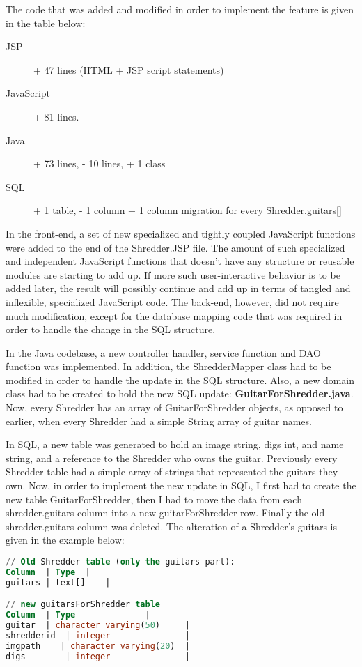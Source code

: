 The code that was added and modified in order to implement the feature is given in the table below:
\begin{description}
  \item[JSP] + 47 lines (HTML + JSP script statements)
  \item[JavaScript] + 81 lines. 
  \item[Java] + 73 lines, - 10 lines, + 1 class
  \item[SQL] + 1 table, - 1 column + 1 column migration for every Shredder.guitars[] 
\end{description}

In the front-end, a set of new specialized and tightly coupled JavaScript functions were added to the end of the Shredder.JSP file. The amount of such specialized and independent JavaScript functions that doesn't have any  structure or reusable modules are starting to add up. If more such user-interactive behavior is to be added later, the result will possibly continue and add up in terms of tangled and inflexible, specialized JavaScript code. The back-end, however, did not require much modification, except for the database mapping code that was required in order to handle the change in the SQL structure.

In the Java codebase, a new controller handler, service function and DAO function was implemented. In addition, the ShredderMapper class had to be modified in order to handle the update in the SQL structure. Also, a new domain class had to be created to hold the new SQL update: \textbf{GuitarForShredder.java}. Now, every Shredder has an array of GuitarForShredder objects, as opposed to earlier, when every Shredder had a simple String array of guitar names. 

In SQL, a new table was generated to hold an image string, digs int, and name string, and a reference to the Shredder who owns the guitar. Previously every Shredder table had a simple array of strings that represented the guitars they own. Now, in order to implement the new update in SQL, I first had to create the new table GuitarForShredder, then I had to move the data from each shredder.guitars column into a new guitarForShredder row. Finally the old shredder.guitars column was deleted. The alteration of a Shredder's guitars is given in the example below: 
\begin{lstlisting}[language=SQL]
// Old Shredder table (only the guitars part):
Column	| Type	|
guitars	| text[] 	|

// new guitarsForShredder table
Column	| Type				|
guitar	| character varying(50) 	|
shredderid	| integer				|
imgpath    | character varying(20) 	|
digs      	| integer				|
\end{lstlisting}



